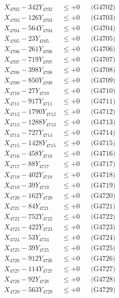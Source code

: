 \documentclass[a4paper,10pt]{article}
\begin{document}
{\begin{align}
X_{4702} - 342Y_{4702} &\leq +0 && \text{(G4702)} \\
X_{4703} - 126Y_{4703} &\leq +0 && \text{(G4703)} \\
X_{4704} - 564Y_{4704} &\leq +0 && \text{(G4704)} \\
X_{4705} - 23Y_{4705} &\leq +0 && \text{(G4705)} \\
X_{4706} - 261Y_{4706} &\leq +0 && \text{(G4706)} \\
X_{4707} - 719Y_{4707} &\leq +0 && \text{(G4707)} \\
X_{4708} - 398Y_{4708} &\leq +0 && \text{(G4708)} \\
X_{4709} - 850Y_{4709} &\leq +0 && \text{(G4709)} \\
X_{4710} - 27Y_{4710} &\leq +0 && \text{(G4710)} \\
\allowbreak
X_{4711} - 917Y_{4711} &\leq +0 && \text{(G4711)} \\
X_{4712} - 1790Y_{4712} &\leq +0 && \text{(G4712)} \\
X_{4713} - 1288Y_{4713} &\leq +0 && \text{(G4713)} \\
X_{4714} - 727Y_{4714} &\leq +0 && \text{(G4714)} \\
X_{4715} - 1428Y_{4715} &\leq +0 && \text{(G4715)} \\
X_{4716} - 458Y_{4716} &\leq +0 && \text{(G4716)} \\
X_{4717} - 88Y_{4717} &\leq +0 && \text{(G4717)} \\
X_{4718} - 402Y_{4718} &\leq +0 && \text{(G4718)} \\
X_{4719} - 39Y_{4719} &\leq +0 && \text{(G4719)} \\
X_{4720} - 162Y_{4720} &\leq +0 && \text{(G4720)} \\
\allowbreak
X_{4721} - 84Y_{4721} &\leq +0 && \text{(G4721)} \\
X_{4722} - 752Y_{4722} &\leq +0 && \text{(G4722)} \\
X_{4723} - 422Y_{4723} &\leq +0 && \text{(G4723)} \\
X_{4724} - 53Y_{4724} &\leq +0 && \text{(G4724)} \\
X_{4725} - 39Y_{4725} &\leq +0 && \text{(G4725)} \\
X_{4726} - 912Y_{4726} &\leq +0 && \text{(G4726)} \\
X_{4727} - 114Y_{4727} &\leq +0 && \text{(G4727)} \\
X_{4728} - 92Y_{4728} &\leq +0 && \text{(G4728)} \\
X_{4729} - 563Y_{4729} &\leq +0 && \text{(G4729)} \\

\end{align}}
\end{document}

